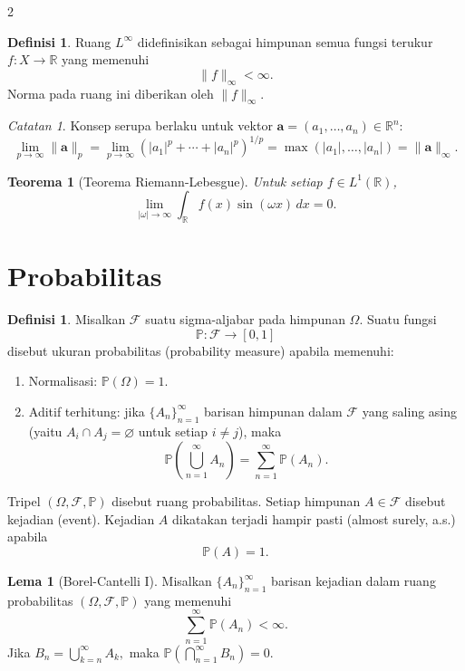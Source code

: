 \documentclass[a4paper,extrafontsizes, 9pt]{memoir}
\theoremstyle{definition}
\newtheorem{definisi}[kalstok]{Definisi}
\newtheorem{lemma}[kalstok]{Lema}
\theoremstyle{plain}
\newtheorem{teorema}[kalstok]{Teorema}
\theoremstyle{remark}
\newtheorem{catatan}[kalstok]{Catatan}
\begin{document}
\begin{multicols}{2}
  \begin{definisi}
    Ruang $L^{\infty}$ didefinisikan sebagai himpunan semua fungsi terukur $f:X\to\mathbb{R}$ yang memenuhi
    \[\|f\|_{\infty}<\infty.\]
    Norma pada ruang ini diberikan oleh $\|f\|_{\infty}$.
  \end{definisi}

  \begin{catatan}
    Konsep serupa berlaku untuk vektor $\mathbf{a}=(a_1,\ldots,a_n)\in\mathbb{R}^{n}$:
    \[\lim_{p\to\infty}\|\mathbf{a}\|_{p}=\lim_{p\to\infty}\left(|a_1|^p+\cdots+|a_n|^p\right)^{1/p}
      =\max(|a_1|,\ldots,|a_n|)=\|\mathbf{a}\|_{\infty}.\]
  \end{catatan}

  \begin{teorema}[Teorema Riemann-Lebesgue]
    Untuk setiap $f\in L^1(\mathbb{R})$,
    \[\lim_{|\omega|\to\infty}\int_{\mathbb{R}}f(x)\sin(\omega x)\,dx=0.\]
  \end{teorema}

  \section{\small Probabilitas}

  \begin{definisi}
    Misalkan $\mathcal{F}$ suatu sigma-aljabar pada himpunan $\Omega$. Suatu fungsi
    \[\mathbb{P}:\mathcal{F}\to[0,1]\]
    disebut ukuran probabilitas (probability measure) apabila memenuhi:
    \begin{enumerate}[leftmargin=*, itemsep=0.5mm]
      \item Normalisasi: $\mathbb{P}(\Omega)=1$.
      \item Aditif terhitung: jika $\{A_n\}_{n=1}^{\infty}$ barisan himpunan dalam $\mathcal{F}$ yang saling asing
            (yaitu $A_i\cap A_j=\varnothing$ untuk setiap $i\ne j$), maka
            \[\mathbb{P}\!\left(\bigcup_{n=1}^{\infty}A_n\right)=\sum_{n=1}^{\infty}\mathbb{P}(A_n).\]
    \end{enumerate}
    Tripel $(\Omega,\mathcal{F},\mathbb{P})$ disebut ruang probabilitas.
    Setiap himpunan $A\in\mathcal{F}$ disebut kejadian (event). Kejadian $A$ dikatakan terjadi hampir pasti
    (almost surely, a.s.) apabila
    \[\mathbb{P}(A)=1.\]
  \end{definisi}

  \begin{lemma}[Borel-Cantelli I]
    Misalkan $\{A_n\}_{n=1}^{\infty}$ barisan kejadian dalam ruang probabilitas $(\Omega,\mathcal{F},\mathbb{P})$
    yang memenuhi
    \[\displaystyle\sum_{n=1}^{\infty}\mathbb{P}(A_n)<\infty.\]
    Jika
    $\displaystyle B_n=\bigcup_{k=n}^{\infty}A_k,$
    maka
    $\displaystyle \mathbb{P}\!\left(\bigcap_{n=1}^{\infty}B_n\right)=0.$
  \end{lemma}


\end{multicols}
\end{document}
